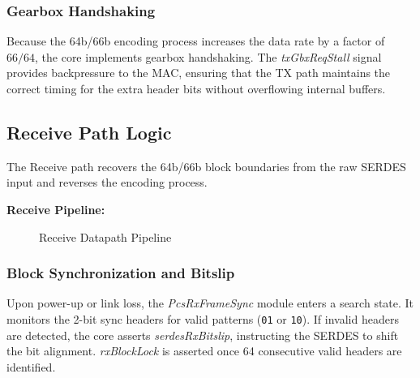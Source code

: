 \subsubsection{Gearbox Handshaking}
Because the 64b/66b encoding process increases the data rate by a factor of $66/64$, the core implements gearbox handshaking. The \textit{txGbxReqStall} signal provides backpressure to the MAC, ensuring that the TX path maintains the correct timing for the extra header bits without overflowing internal buffers.

\subsection{Receive Path Logic}
The Receive path recovers the 64b/66b block boundaries from the raw SERDES input and reverses the encoding process.

\textbf{Receive Pipeline:}
\begin{figure}[H]
\centering
{}
\caption{Receive Datapath Pipeline}\label{fig:pcs_rx_pipe}
\end{figure}

\subsubsection{Block Synchronization and Bitslip}
Upon power-up or link loss, the \textit{PcsRxFrameSync} module enters a search state. It monitors the 2-bit sync headers for valid patterns (\texttt{01} or \texttt{10}). If invalid headers are detected, the core asserts \textit{serdesRxBitslip}, instructing the SERDES to shift the bit alignment. \textit{rxBlockLock} is asserted once 64 consecutive valid headers are identified.

